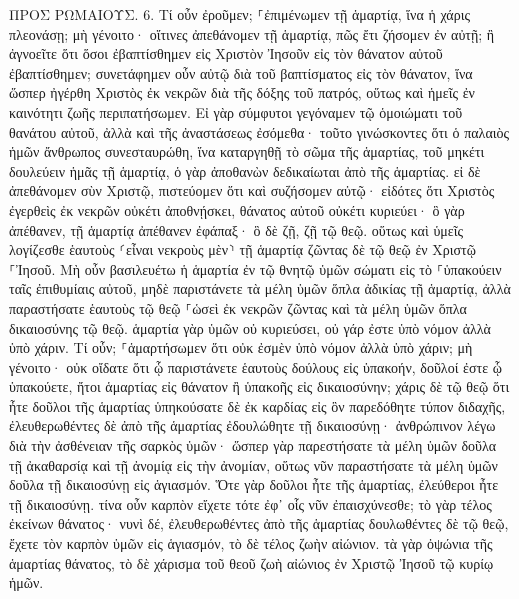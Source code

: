 \documentclass[twoside, 9pt]{extreport}
\begin{document}
ΠΡΟΣ ΡΩΜΑΙΟΥΣ.
6.
Τί οὖν ἐροῦμεν; ⸀ἐπιμένωμεν τῇ ἁμαρτίᾳ, ἵνα ἡ χάρις πλεονάσῃ; 
μὴ γένοιτο· οἵτινες ἀπεθάνομεν τῇ ἁμαρτίᾳ, πῶς ἔτι ζήσομεν ἐν αὐτῇ; 
ἢ ἀγνοεῖτε ὅτι ὅσοι ἐβαπτίσθημεν εἰς Χριστὸν Ἰησοῦν εἰς τὸν θάνατον αὐτοῦ ἐβαπτίσθημεν; 
συνετάφημεν οὖν αὐτῷ διὰ τοῦ βαπτίσματος εἰς τὸν θάνατον, ἵνα ὥσπερ ἠγέρθη Χριστὸς ἐκ νεκρῶν διὰ τῆς δόξης τοῦ πατρός, οὕτως καὶ ἡμεῖς ἐν καινότητι ζωῆς περιπατήσωμεν. 
Εἰ γὰρ σύμφυτοι γεγόναμεν τῷ ὁμοιώματι τοῦ θανάτου αὐτοῦ, ἀλλὰ καὶ τῆς ἀναστάσεως ἐσόμεθα· 
τοῦτο γινώσκοντες ὅτι ὁ παλαιὸς ἡμῶν ἄνθρωπος συνεσταυρώθη, ἵνα καταργηθῇ τὸ σῶμα τῆς ἁμαρτίας, τοῦ μηκέτι δουλεύειν ἡμᾶς τῇ ἁμαρτίᾳ, 
ὁ γὰρ ἀποθανὼν δεδικαίωται ἀπὸ τῆς ἁμαρτίας. 
εἰ δὲ ἀπεθάνομεν σὺν Χριστῷ, πιστεύομεν ὅτι καὶ συζήσομεν αὐτῷ· 
εἰδότες ὅτι Χριστὸς ἐγερθεὶς ἐκ νεκρῶν οὐκέτι ἀποθνῄσκει, θάνατος αὐτοῦ οὐκέτι κυριεύει· 
ὃ γὰρ ἀπέθανεν, τῇ ἁμαρτίᾳ ἀπέθανεν ἐφάπαξ· ὃ δὲ ζῇ, ζῇ τῷ θεῷ. 
οὕτως καὶ ὑμεῖς λογίζεσθε ἑαυτοὺς ⸂εἶναι νεκροὺς μὲν⸃ τῇ ἁμαρτίᾳ ζῶντας δὲ τῷ θεῷ ἐν Χριστῷ ⸀Ἰησοῦ. 
Μὴ οὖν βασιλευέτω ἡ ἁμαρτία ἐν τῷ θνητῷ ὑμῶν σώματι εἰς τὸ ⸀ὑπακούειν ταῖς ἐπιθυμίαις αὐτοῦ, 
μηδὲ παριστάνετε τὰ μέλη ὑμῶν ὅπλα ἀδικίας τῇ ἁμαρτίᾳ, ἀλλὰ παραστήσατε ἑαυτοὺς τῷ θεῷ ⸀ὡσεὶ ἐκ νεκρῶν ζῶντας καὶ τὰ μέλη ὑμῶν ὅπλα δικαιοσύνης τῷ θεῷ. 
ἁμαρτία γὰρ ὑμῶν οὐ κυριεύσει, οὐ γάρ ἐστε ὑπὸ νόμον ἀλλὰ ὑπὸ χάριν. 
Τί οὖν; ⸀ἁμαρτήσωμεν ὅτι οὐκ ἐσμὲν ὑπὸ νόμον ἀλλὰ ὑπὸ χάριν; μὴ γένοιτο· 
οὐκ οἴδατε ὅτι ᾧ παριστάνετε ἑαυτοὺς δούλους εἰς ὑπακοήν, δοῦλοί ἐστε ᾧ ὑπακούετε, ἤτοι ἁμαρτίας εἰς θάνατον ἢ ὑπακοῆς εἰς δικαιοσύνην; 
χάρις δὲ τῷ θεῷ ὅτι ἦτε δοῦλοι τῆς ἁμαρτίας ὑπηκούσατε δὲ ἐκ καρδίας εἰς ὃν παρεδόθητε τύπον διδαχῆς, 
ἐλευθερωθέντες δὲ ἀπὸ τῆς ἁμαρτίας ἐδουλώθητε τῇ δικαιοσύνῃ· 
ἀνθρώπινον λέγω διὰ τὴν ἀσθένειαν τῆς σαρκὸς ὑμῶν· ὥσπερ γὰρ παρεστήσατε τὰ μέλη ὑμῶν δοῦλα τῇ ἀκαθαρσίᾳ καὶ τῇ ἀνομίᾳ εἰς τὴν ἀνομίαν, οὕτως νῦν παραστήσατε τὰ μέλη ὑμῶν δοῦλα τῇ δικαιοσύνῃ εἰς ἁγιασμόν. 
Ὅτε γὰρ δοῦλοι ἦτε τῆς ἁμαρτίας, ἐλεύθεροι ἦτε τῇ δικαιοσύνῃ. 
τίνα οὖν καρπὸν εἴχετε τότε ἐφ᾽ οἷς νῦν ἐπαισχύνεσθε; τὸ γὰρ τέλος ἐκείνων θάνατος· 
νυνὶ δέ, ἐλευθερωθέντες ἀπὸ τῆς ἁμαρτίας δουλωθέντες δὲ τῷ θεῷ, ἔχετε τὸν καρπὸν ὑμῶν εἰς ἁγιασμόν, τὸ δὲ τέλος ζωὴν αἰώνιον. 
τὰ γὰρ ὀψώνια τῆς ἁμαρτίας θάνατος, τὸ δὲ χάρισμα τοῦ θεοῦ ζωὴ αἰώνιος ἐν Χριστῷ Ἰησοῦ τῷ κυρίῳ ἡμῶν. 
\end{document}
